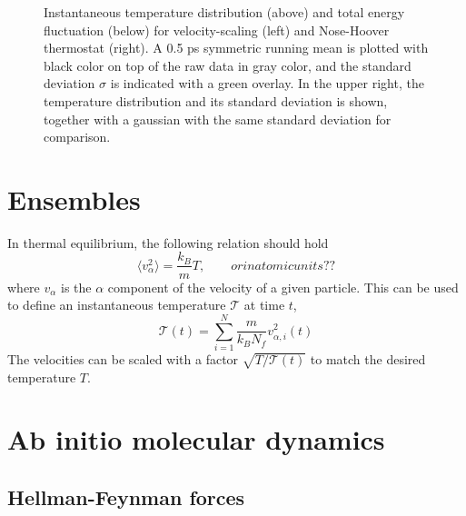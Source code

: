 \documentclass[11pt,bibliography=totoc,index=totoc]{scrbook}   %
\begin{document}
\begin{figure}[htbp]
  \centering
  \caption{
    Instantaneous temperature distribution (above) and total energy fluctuation (below) 
    for velocity-scaling (left) and Nose-Hoover thermostat (right). A 0.5 ps symmetric running mean 
    is plotted with black color on top of the raw data in gray color, and the standard deviation $\sigma$ 
    is indicated with a green overlay. In the upper right, the temperature distribution and its 
    standard deviation is shown, together with a gaussian with the same standard deviation for comparison.
   }
  \label{fig:md_test_temperature}
\end{figure}

\section{Ensembles}

In thermal equilibrium, the following relation should hold
\begin{equation}
  \langle v_{\alpha}^2 \rangle = \frac{k_B}{m} T, \qquad{or in atomic units??}
\end{equation}
where $v_{\alpha}$ is the $\alpha$ component of the velocity of a given particle.
This can be used to define an instantaneous temperature $\mathcal{T}$ at time $t$,
\begin{equation}
  \mathcal{T}(t) = \sum_{i=1}^N \frac{m}{k_B N_f} v_{\alpha,i}^2(t)
\end{equation}
The velocities can be scaled with a factor $\sqrt{T/\mathcal{T}(t)}$ to match the desired temperature $T$.




\section{Ab initio molecular dynamics}

\subsection{Hellman-Feynman forces}
\end{document}

